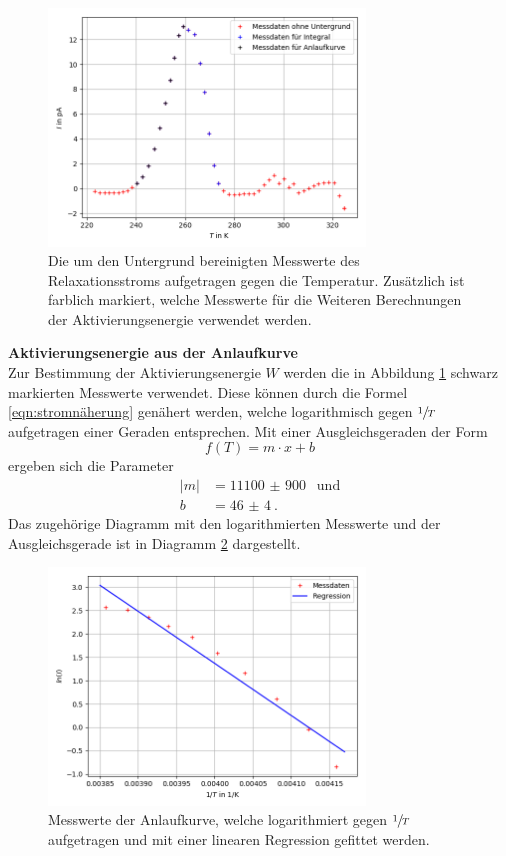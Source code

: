 \begin{figure}[H]
  \centering
  \includegraphics[width=0.75\textwidth]{Dipol1ohneUntergrund.png}
  \caption{Die um den Untergrund bereinigten Messwerte des Relaxationsstroms aufgetragen gegen die
  Temperatur. Zusätzlich ist farblich markiert, welche Messwerte für die Weiteren Berechnungen der Aktivierungsenergie
  verwendet werden.}
  \label{fig:Fig2}
\end{figure}


\textbf{Aktivierungsenergie aus der Anlaufkurve}\\
Zur Bestimmung der Aktivierungsenergie $W$ werden die in Abbildung \ref{fig:Fig2} schwarz
markierten Messwerte verwendet. Diese können durch die Formel \ref{eqn:stromnäherung} genähert werden,
welche logarithmisch gegen $\sfrac{1}{T}$ aufgetragen einer Geraden entsprechen. Mit einer
Ausgleichsgeraden der Form
\begin{equation}
  f(T)=m\cdot x+b
\end{equation}
ergeben sich die Parameter
\begin{align*}
  |m|&=\SI{11100(900)}{}\;\; \text{und}\\
  b&=\SI{46(4)}{}.
\end{align*}
Das zugehörige Diagramm mit den logarithmierten Messwerte und der Ausgleichsgerade ist in Diagramm \ref{fig:Fig3}
dargestellt.

\begin{figure}[H]
  \centering
  \includegraphics[width=0.75\textwidth]{Dipol1Anlauf.png}
  \caption{Messwerte der Anlaufkurve, welche logarithmiert gegen $\sfrac{1}{T}$ aufgetragen und mit
  einer linearen Regression gefittet werden.}
  \label{fig:Fig3}
\end{figure}

